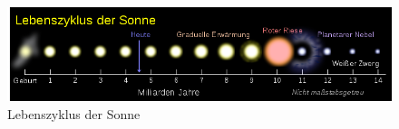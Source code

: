 \documentclass{article}
\begin{document}
  \newpage
  \begin{figure}[t]
    \centering
    \includegraphics[width=\textwidth]{images/life_cycle_sun.png}
    \caption[Lebenszyklus der Sonne]{Lebenszyklus der
    Sonne\footnotemark}
    \label{img:life-cycle-sun}
  \end{figure}
\end{document}
